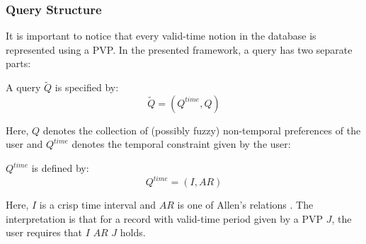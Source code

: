 

\subsubsection{Query Structure}
It is important to notice that every valid-time notion in the database is represented using a PVP. In the presented framework, a query has two separate parts:



\begin{definition}
A query $\tilde Q$ is specified by:
\begin{equation}
\label{eq:query-definition}
\tilde Q = \left( Q^{time}, Q \right)
\end{equation}
\end{definition}
Here, $Q$ denotes the collection of (possibly fuzzy) non-temporal preferences of the user and $Q^{time}$ denotes the temporal constraint given by the user:
\begin{definition}
 $Q^{time}$ is defined by:
\begin{equation}
Q^{time} = \left( I , AR \right)
\end{equation}
\end{definition}
Here, $I$ is a crisp time interval and $AR$ is one of Allen's relations \cite{Allen83}. The interpretation is that for a record with valid-time period given by a PVP $J$, the user requires that $I$ $AR$ $J$ holds.



